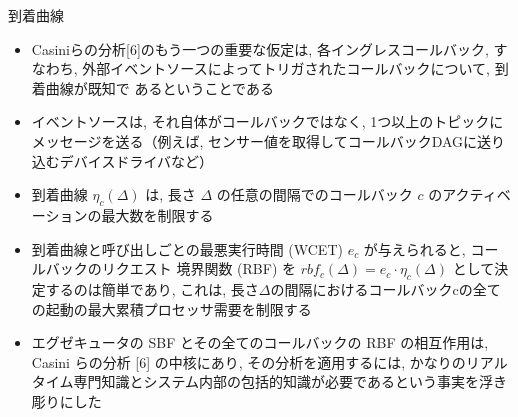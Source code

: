 \begin{frame}{到着曲線}
    \begin{itemize}
        \item Casiniらの分析[6]のもう一つの重要な仮定は, 各イングレスコールバック,  すなわち, 外部イベントソースによってトリガされたコールバックについて, 到着曲線が既知で あるということである
        \item イベントソースは, それ自体がコールバックではなく, 1つ以上のトピックにメッセージを送る（例えば, センサー値を取得してコールバックDAGに送り込むデバイスドライバなど）
        \item 到着曲線 $\eta_{c}(\Delta)$ は, 長さ $\Delta$ の任意の間隔でのコールバック $c$ のアクティベーションの最大数を制限する
    \end{itemize}
\end{frame}

\begin{frame}{}
    \begin{itemize}
        \item 到着曲線と呼び出しごとの最悪実行時間 (WCET) $e_{c}$ が与えられると, コールバックのリクエスト 境界関数 (RBF) を $r b f_{c}(\Delta)=e_{c} \cdot \eta_{c}(\Delta)$ として決定するのは簡単であり, これは, 長さ$\Delta$の間隔におけるコールバックcの全ての起動の最大累積プロセッサ需要を制限する
        \item エグゼキュータの SBF とその全てのコールバックの RBF の相互作用は, Casini らの分析 [6] の中核にあり, その分析を適用するには, かなりのリアルタイム専門知識とシステム内部の包括的知識が必要であるという事実を浮き彫りにした
    \end{itemize}
\end{frame}
